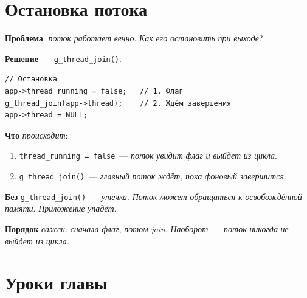 \section{Остановка потока}
\label{sec:pc-stop}

\textbf{Проблема}: \emph{поток} \emph{работает} \emph{вечно}.
\emph{Как} \emph{его} \emph{остановить} \emph{при} \emph{выходе}?

\textbf{Решение}~--- \texttt{g\_thread\_join()}.

\begin{listing}[htbp]
\begin{verbatim}
// Остановка
app->thread_running = false;   // 1. Флаг
g_thread_join(app->thread);    // 2. Ждём завершения
app->thread = NULL;
\end{verbatim}
\caption{Остановка потока}
\label{lst:pc-stop}
\end{listing}

\textbf{Что} \emph{происходит}:
\begin{enumerate}
    \item \texttt{thread\_running = false}~--- \emph{поток}
          \emph{увидит} \emph{флаг} \emph{и} \emph{выйдет}
          \emph{из} \emph{цикла}.
    \item \texttt{g\_thread\_join()}~--- \emph{главный}
          \emph{поток} \emph{ждёт}, \emph{пока} \emph{фоновый}
          \emph{завершится}.
\end{enumerate}

\begin{keybox}
\textbf{Без} \texttt{g\_thread\_join()}~--- \emph{утечка}.
\emph{Поток} \emph{может} \emph{обращаться} \emph{к}
\emph{освобождённой} \emph{памяти}. \emph{Приложение}
\emph{упадёт}.
\end{keybox}

\begin{ideabox}
\textbf{Порядок} \emph{важен}: \emph{сначала} \emph{флаг},
\emph{потом} \emph{join}. \emph{Наоборот}~--- \emph{поток}
\emph{никогда} \emph{не} \emph{выйдет} \emph{из} \emph{цикла}.
\end{ideabox}

\section{Уроки главы}
\label{sec:pc-lessons}

